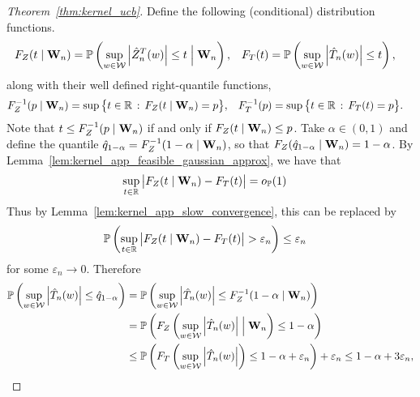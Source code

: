 \begin{proof}[Theorem~\ref{thm:kernel_ucb}]
  Define the following (conditional) distribution functions.
  \begin{align*}
    F_Z(t \mid \mathbf{W}_n)
    &=
    \mathbb{P}\left(
      \sup_{w \in \mathcal{W}}
      \left| \hat Z_n^T(w) \right|
      \leq t
      \Bigm\vert \mathbf{W}_n
    \right),
    &F_T(t)
    &=
    \mathbb{P}\left(
      \sup_{w \in \mathcal{W}}
      \left| \hat T_n(w) \right|
      \leq t
    \right),
  \end{align*}
  along with their well defined right-quantile functions,
  \begin{align*}
    F_Z^{-1}(p \mid \mathbf{W}_n)
    &=
    \sup
    \big\{
      t \in \mathbb{R}
      \, : \,
      F_Z(t \mid \mathbf{W}_n)
      = p
    \big\},
    &F_T^{-1}(p)
    &=
    \sup
    \big\{
      t \in \mathbb{R}
      \, : \,
      F_T(t)
      = p
    \big\}.
  \end{align*}
  Note that
  $t \leq F_Z^{-1}(p \mid \mathbf{W}_n)$
  if and only if
  $F_Z(t \mid \mathbf{W}_n) \leq p$.
  Take $\alpha \in (0,1)$ and
  define the quantile
  $\hat q_{1-\alpha} = F_Z^{-1}(1-\alpha \mid \mathbf{W}_n)$,
  so that
  $F_Z(\hat q_{1-\alpha} \mid \mathbf{W}_n) = 1-\alpha$.
  By Lemma~\ref{lem:kernel_app_feasible_gaussian_approx},
  we have that
  \begin{align*}
    \sup_{t \in \mathbb{R}}
    \big|
    F_Z(t \mid \mathbf{W}_n) - F_T(t)
    \big|
    &=
    o_{\mathbb{P}}(1)
  \end{align*}
  Thus by Lemma~\ref{lem:kernel_app_slow_convergence},
  this can be replaced by
  \begin{align*}
    \mathbb{P}\left(
      \sup_{t \in \mathbb{R}} \big| F_Z(t \mid \mathbf{W}_n) - F_T(t) \big|
      > \varepsilon_n
    \right)
    &\leq \varepsilon_n
  \end{align*}
  for some $\varepsilon_n \to 0$.
  Therefore
  \begin{align*}
    \P\left(
      \sup_{w \in \cW}
      \left|
      \hat T_n(w)
      \right|
      \leq
      \hat q_{1-\alpha}
    \right)
    &=
    \P\left(
      \sup_{w \in \cW}
      \left|
      \hat T_n(w)
      \right|
      \leq
      F_Z^{-1}(1-\alpha \mid \bW_n)
    \right) \\
    &=
    \P\left(
      F_Z\left(
        \sup_{w \in \cW}
        \left|
        \hat T_n(w)
        \right|
        \Bigm\vert \bW_n
      \right)
      \leq
      1 - \alpha
    \right) \\
    &\leq
    \P\left(
      F_T\left(
        \sup_{w \in \cW}
        \left|
        \hat T_n(w)
        \right|
      \right)
      \leq
      1 - \alpha + \varepsilon_n
    \right)
    + \varepsilon_n
    \leq 1 - \alpha + 3\varepsilon_n,

\end{align*}
\end{proof}

